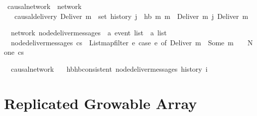\documentclass[acmlarge,review,anonymous]{acmart}\settopmatter{printfolios=true}
\begin{document}
\begin{isabellebody}
\isanewline
{}\isamarkupfalse%
\ causal{\isacharunderscore}network\ {\isacharequal}\ network\ {\isacharplus}\isanewline
\ \ \ causal{\isacharunderscore}delivery{\isacharcolon}\ {\isachardoublequoteopen}Deliver\ m{}\ {\isasymin}\ set\ {\isacharparenleft}history\ j{\isacharparenright}\ {\isasymLongrightarrow}\ hb\ m{}\ m{}\ {\isasymLongrightarrow}\ Deliver\ m{}\ {\isasymsqsubset}\isactrlsup j\ Deliver\ m{}{\isachardoublequoteclose}\isanewline
\isanewline
\end{isabellebody}

\begin{isabellebody}
\isanewline
{}\isamarkupfalse%
\ {\isacharparenleft}\ network{\isacharparenright}\ node{\isacharunderscore}deliver{\isacharunderscore}messages\ {\isacharcolon}{\isacharcolon}\ {\isachardoublequoteopen}{\isacharprime}a\ event\ list\ {\isasymRightarrow}\ {\isacharprime}a\ list{\isachardoublequoteclose}\ \isanewline
\ \ {\isachardoublequoteopen}node{\isacharunderscore}deliver{\isacharunderscore}messages\ cs\ {\isasymequiv}\ List{\isachardot}map{\isacharunderscore}filter\ {\isacharparenleft}{\isasymlambda}e{\isachardot}\ case\ e\ of\ Deliver\ m\ {\isasymRightarrow}\ Some\ m\ {\isacharbar}\ {\isacharunderscore}\ {\isasymRightarrow}\ None{\isacharparenright}\ cs{\isachardoublequoteclose}\isanewline
\end{isabellebody}

\begin{isabellebody}
\isanewline
{}\isamarkupfalse%
\ {\isacharparenleft}\ causal{\isacharunderscore}network{\isacharparenright}\isanewline
\ \ \ {\isachardoublequoteopen}hb{\isachardot}hb{\isacharunderscore}consistent\ {\isacharparenleft}node{\isacharunderscore}deliver{\isacharunderscore}messages\ {\isacharparenleft}history\ i{\isacharparenright}{\isacharparenright}{\isachardoublequoteclose}\isanewline
\end{isabellebody}


\section{Replicated Growable Array}
\label{sect.rga}
\end{document}
